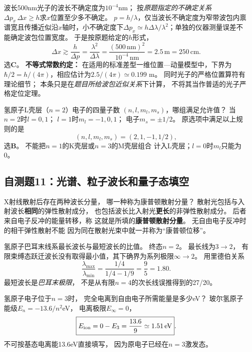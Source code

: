 \problemtext 波长500nm光子的波长不确定度为$10^{-4}$nm；
按\emph{原题指定的不确定关系}
$\Delta p_x\,\Delta x\ge h$求$x$位置至少多不确定。
\workings
$p=h/\lambda$，仅当波长不确定度为窄带波包内禀谱宽且传播近似沿$x$轴时，小不确定度下$\Delta p_x\simeq h\Delta\lambda/\lambda^2$；单独的仪器测量误差不能确定波包位置宽度。
于是按原题给定的$h$形式，
\[
\boxed{\Delta x\gtrsim\frac h{\Delta p}
=\frac{\lambda^2}{\Delta\lambda}
=\frac{(500\,\mathrm{nm})^2}{10^{-4}\,\mathrm{nm}}
=2.5\,\mathrm m=250\,\mathrm{cm}}.
\]
选\textbf{C}。
\crosscheck \textbf{不等式常数约定：}
在适用的标准差型一维位置—动量模型中，下界为$\hbar/2=h/(4\pi)$，相应估计为$2.5/(4\pi)\simeq0.199$ m。
同时光子的严格位置算符有理论细节；
本条只是在\emph{题目所给波包近似关系}下计算，
不将其当作普适的光子严格定位定理。

\problemtext 氢原子L壳层（$n=2$）电子的四量子数
$(n,l,m_l,m_s)$，哪组满足允许值？
\workings
当$n=2$时$l=0,1$；
$l=1$时$m_l=-1,0,1$；
电子$m_s=\pm1/2$。
原选项中满足以上规则的是
\[
\boxed{(n,l,m_l,m_s)=(2,1,-1,1/2)},
\]
选\textbf{B}。
\crosscheck 不能把$n=1$的K壳层或$n=3$的M壳层组合
计入L壳层；$l=0$时$m_l$只能为0。

\subsection{自测题11：光谱、粒子波长和量子态填空}

\problemtext X射线散射后存在两种波长分量，
哪一种称为康普顿散射分量？
\workings
散射光包括与入射波长\textbf{相同}的弹性散射成分，
也包括波长比入射光\textbf{更长}的非弹性散射成分。
后者来自电子反冲的能量转移，称
这就是所填的\textbf{康普顿散射分量}。
\crosscheck 无自由电子反冲时的相干弹性散射不能
因为同在散射光束中就一并称为“康普顿位移”。

\problemtext 氢原子巴耳末线系最长波长与最短波长的比值。
\workings
终态$n=2$。
最长线为$3\to2$，
有限束缚态跃迁波长没有取得最小值，其下确界为系列极限$\infty\to2$。
用里德伯关系
\[
\boxed{\frac{\lambda_{\max}}{\lambda_{\min}}
=\frac{1/4}{1/4-1/9}
=\frac95=1.80}.
\]
\crosscheck 最短波长是\emph{巴耳末极限}，
不是从有限$n=4$的次长线误推得到的27/20。

\problemtext 氢原子电子位于$n=3$时，
完全电离到自由电子所需能量是多少eV？
\workings
玻尔氢原子能级$E_n=-13.6/n^2$eV，
电离极限$E_\infty=0$，
\[
\boxed{E_{\rm ion}=0-E_3=\frac{13.6}{9}
\simeq1.51\,\mathrm{eV}}.
\]
\crosscheck 不可按基态电离能13.6eV直接填写，
因为原电子已经在$n=3$激发态。

